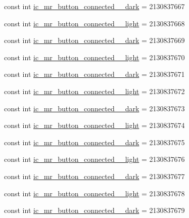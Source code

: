 \begin{CompactItemize}
\item 
const int \hyperlink{class__2doo_1_1_droid_1_1_resource_1_1_drawable_677ffd4cafd8eb17743aface64c4aaad}{ic\_\-mr\_\-button\_\-connected\_\_\-dark} = 2130837667
\item 
const int \hyperlink{class__2doo_1_1_droid_1_1_resource_1_1_drawable_05eeb57c1e6dbcd225072aafb02be72e}{ic\_\-mr\_\-button\_\-connected\_\_\-light} = 2130837668
\item 
const int \hyperlink{class__2doo_1_1_droid_1_1_resource_1_1_drawable_03d15b847b5589bd63de4db793e69f8d}{ic\_\-mr\_\-button\_\-connected\_\_\-dark} = 2130837669
\item 
const int \hyperlink{class__2doo_1_1_droid_1_1_resource_1_1_drawable_924461995ace622117367a599dc41c8a}{ic\_\-mr\_\-button\_\-connected\_\_\-light} = 2130837670
\item 
const int \hyperlink{class__2doo_1_1_droid_1_1_resource_1_1_drawable_f5d355f8a3d8d30b799d6ee75c6612b1}{ic\_\-mr\_\-button\_\-connected\_\_\-dark} = 2130837671
\item 
const int \hyperlink{class__2doo_1_1_droid_1_1_resource_1_1_drawable_ebfbd080bf12631bea89d1afe02ed4d3}{ic\_\-mr\_\-button\_\-connected\_\_\-light} = 2130837672
\item 
const int \hyperlink{class__2doo_1_1_droid_1_1_resource_1_1_drawable_df2978e829800e146fa86df9e4779f1e}{ic\_\-mr\_\-button\_\-connected\_\_\-dark} = 2130837673
\item 
const int \hyperlink{class__2doo_1_1_droid_1_1_resource_1_1_drawable_ed71787e5a0007e36cc828cde8d37a51}{ic\_\-mr\_\-button\_\-connected\_\_\-light} = 2130837674
\item 
const int \hyperlink{class__2doo_1_1_droid_1_1_resource_1_1_drawable_4c51824cf73a41547a2a2ef3c89e82d7}{ic\_\-mr\_\-button\_\-connected\_\_\-dark} = 2130837675
\item 
const int \hyperlink{class__2doo_1_1_droid_1_1_resource_1_1_drawable_868d1bbacefa0b2fd1e751e2d8163500}{ic\_\-mr\_\-button\_\-connected\_\_\-light} = 2130837676
\item 
const int \hyperlink{class__2doo_1_1_droid_1_1_resource_1_1_drawable_023a6d335a3f4418f49524f3cbf6b70e}{ic\_\-mr\_\-button\_\-connected\_\_\-dark} = 2130837677
\item 
const int \hyperlink{class__2doo_1_1_droid_1_1_resource_1_1_drawable_4ce0701132c1fa27d59c7b90ab061929}{ic\_\-mr\_\-button\_\-connected\_\_\-light} = 2130837678
\item 
const int \hyperlink{class__2doo_1_1_droid_1_1_resource_1_1_drawable_60289ec0af5f4d2332eee82a3dd17a0a}{ic\_\-mr\_\-button\_\-connected\_\_\-dark} = 2130837679

\end{CompactItemize}

